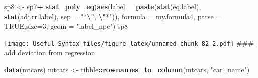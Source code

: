 \documentclass[
]{article}
\newenvironment{Shaded}{\begin{snugshade}}{\end{snugshade}}
\newcommand{\AttributeTok}[1]{\textcolor[rgb]{0.13,0.29,0.53}{#1}}
\newcommand{\ConstantTok}[1]{\textcolor[rgb]{0.56,0.35,0.01}{#1}}
\newcommand{\DecValTok}[1]{\textcolor[rgb]{0.00,0.00,0.81}{#1}}
\newcommand{\FunctionTok}[1]{\textcolor[rgb]{0.13,0.29,0.53}{\textbf{#1}}}
\newcommand{\NormalTok}[1]{#1}
\newcommand{\OtherTok}[1]{\textcolor[rgb]{0.56,0.35,0.01}{#1}}
\newcommand{\SpecialCharTok}[1]{\textcolor[rgb]{0.81,0.36,0.00}{\textbf{#1}}}
\newcommand{\StringTok}[1]{\textcolor[rgb]{0.31,0.60,0.02}{#1}}
\begin{document}
\begin{Shaded}
\begin{Highlighting}[]
\NormalTok{sp8 }\OtherTok{\textless{}{-}}\NormalTok{ sp7}\SpecialCharTok{+}
  \FunctionTok{stat\_poly\_eq}\NormalTok{(}\FunctionTok{aes}\NormalTok{(}\AttributeTok{label =}  \FunctionTok{paste}\NormalTok{(}\FunctionTok{stat}\NormalTok{(eq.label),}
                                  \FunctionTok{stat}\NormalTok{(adj.rr.label), }\AttributeTok{sep =} \StringTok{"*}\SpecialCharTok{\textbackslash{}"}\StringTok{, }\SpecialCharTok{\textbackslash{}"}\StringTok{*"}\NormalTok{)),}
               \AttributeTok{formula =}\NormalTok{ my.formula4, }\AttributeTok{parse =} \ConstantTok{TRUE}\NormalTok{,}\AttributeTok{size=}\DecValTok{3}\NormalTok{,  }\AttributeTok{geom =} \StringTok{"label\_npc"}\NormalTok{)}
\NormalTok{sp8}
\end{Highlighting}
\end{Shaded}

\texttt{[image: Useful-Syntax\_files/figure-latex/unnamed-chunk-82-2.pdf]}
\#\#\# add deviation from regression

\begin{Shaded}
\begin{Highlighting}[]
\FunctionTok{data}\NormalTok{(mtcars)}
\NormalTok{mtcars }\OtherTok{\textless{}{-}}\NormalTok{ tibble}\SpecialCharTok{::}\FunctionTok{rownames\_to\_column}\NormalTok{(mtcars, }\StringTok{"car\_name"}\NormalTok{)}
\end{Highlighting}
\end{Shaded}
\end{document}
